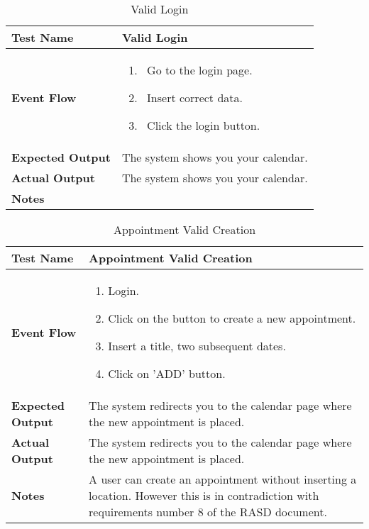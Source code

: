 \begin{table}[h]	
\centering
\def\arraystretch{1.5}
\begin{tabular}{|m{7cm}|m{7cm}|}
	\hline
	\textbf{Test Name}            &  Valid Login  \\ \hline
	\textbf{Event Flow}             &  
		\begin{enumerate}
			\item~Go to the login page.
			\item~Insert correct data.
			\item~Click the login button.
		\end{enumerate}
	 \\ \hline
	\textbf{Expected Output}  &  The system shows you your calendar.   \\ \hline
	\textbf{Actual Output}       &  The system shows you your calendar.   \\ \hline
	\textbf{Notes} & \\ \hline
\end{tabular}
\caption{Valid Login}
\end{table}


\begin{table}[h]	
\centering
\def\arraystretch{1.5}
\begin{tabular}{|m{7cm}|m{7cm}|}
	\hline
	\textbf{Test Name}            & Appointment Valid Creation   \\ \hline
	\textbf{Event Flow}             & 
	 	\begin{enumerate}
	 	\item Login.
	 	\item Click on the button to create a new appointment.
	 	\item Insert a title, two subsequent dates.
	 	\item Click on 'ADD' button.
	 \end{enumerate} \\ \hline
	\textbf{Expected Output}  &  The system redirects you to the calendar page where the new appointment is placed.   \\ \hline
	\textbf{Actual Output}       & The system redirects you to the calendar page where the new appointment is placed.    \\ \hline
	\textbf{Notes} & A user can create an appointment without inserting a location. However this is in contradiction with requirements number 8 of the RASD document. \\ \hline
\end{tabular}
\caption{Appointment Valid Creation}
\end{table}


